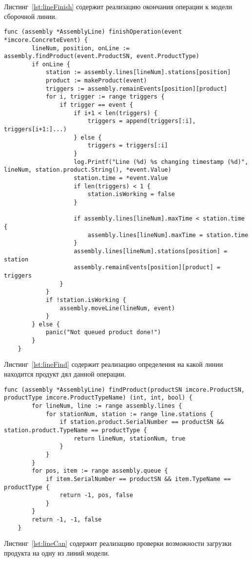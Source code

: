 Листинг~\ref{lst:lineFinish} содержит реализацию окончания операции к модели сборочной линии.

\begin{lstlisting}[language=Golang,caption={Метод окончания операции},label=lst:lineFinish]
	func (assembly *AssemblyLine) finishOperation(event *imcore.ConcreteEvent) {
		lineNum, position, onLine := assembly.findProduct(event.ProductSN, event.ProductType)
		if onLine {
			station := assembly.lines[lineNum].stations[position]
			product := makeProduct(event)
			triggers := assembly.remainEvents[position][product]
			for i, trigger := range triggers {
				if trigger == event {
					if i+1 < len(triggers) {
						triggers = append(triggers[:i], triggers[i+1:]...)
					} else {
						triggers = triggers[:i]
					}
					log.Printf("Line (%d) %s changing timestamp (%d)", lineNum, station.product.String(), *event.Value)
					station.time = *event.Value
					if len(triggers) < 1 {
						station.isWorking = false
					}
					
					if assembly.lines[lineNum].maxTime < station.time {
						assembly.lines[lineNum].maxTime = station.time
					}
					assembly.lines[lineNum].stations[position] = station
					assembly.remainEvents[position][product] = triggers
				}
			}
			if !station.isWorking {
				assembly.moveLine(lineNum, event)
			}
		} else {
			panic("Not queued product done!")
		}
	}
\end{lstlisting}

Листинг~\ref{lst:lineFind} содержит реализацию определения на какой линии находится продукт дял данной операции.

\begin{lstlisting}[language=Golang,caption={Метод, производящий определение линии по заданной продукции},label=lst:lineFind]
	func (assembly *AssemblyLine) findProduct(productSN imcore.ProductSN, productType imcore.ProductTypeName) (int, int, bool) {
		for lineNum, line := range assembly.lines {
			for stationNum, station := range line.stations {
				if station.product.SerialNumber == productSN && station.product.TypeName == productType {
					return lineNum, stationNum, true
				}
			}
		}
		for pos, item := range assembly.queue {
			if item.SerialNumber == productSN && item.TypeName == productType {
				return -1, pos, false
			}
		}
		return -1, -1, false
	}
\end{lstlisting}

Листинг~\ref{lst:lineCan} содержит реализацию проверки возможности загрузки продукта на одну из линий модели.


